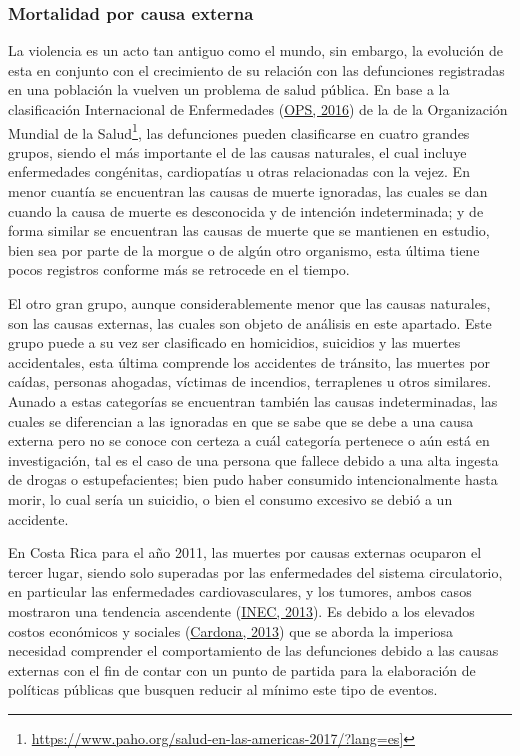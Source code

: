 \documentclass[
]{article}
\begin{document}
\subsubsection{Mortalidad por causa externa}

La violencia es un acto tan antiguo como el mundo, sin embargo, la
evolución de esta en conjunto con el crecimiento de su relación con las
defunciones registradas en una población la vuelven un problema de salud
pública. En base a la clasificación Internacional de Enfermedades
(\protect\hyperlink{ref-CIE10}{OPS, 2016}) de la de la Organización
Mundial de la Salud\footnote{\url{https://www.paho.org/salud-en-las-americas-2017/?lang=es}{]}},
las defunciones pueden clasificarse en cuatro grandes grupos, siendo el
más importante el de las causas naturales, el cual incluye enfermedades
congénitas, cardiopatías u otras relacionadas con la vejez. En menor
cuantía se encuentran las causas de muerte ignoradas, las cuales se dan
cuando la causa de muerte es desconocida y de intención indeterminada; y
de forma similar se encuentran las causas de muerte que se mantienen en
estudio, bien sea por parte de la morgue o de algún otro organismo, esta
última tiene pocos registros conforme más se retrocede en el tiempo.

El otro gran grupo, aunque considerablemente menor que las causas
naturales, son las causas externas, las cuales son objeto de análisis en
este apartado. Este grupo puede a su vez ser clasificado en homicidios,
suicidios y las muertes accidentales, esta última comprende los
accidentes de tránsito, las muertes por caídas, personas ahogadas,
víctimas de incendios, terraplenes u otros similares. Aunado a estas
categorías se encuentran también las causas indeterminadas, las cuales
se diferencian a las ignoradas en que se sabe que se debe a una causa
externa pero no se conoce con certeza a cuál categoría pertenece o aún
está en investigación, tal es el caso de una persona que fallece debido
a una alta ingesta de drogas o estupefacientes; bien pudo haber
consumido intencionalmente hasta morir, lo cual sería un suicidio, o
bien el consumo excesivo se debió a un accidente.

En Costa Rica para el año 2011, las muertes por causas externas ocuparon
el tercer lugar, siendo solo superadas por las enfermedades del sistema
circulatorio, en particular las enfermedades cardiovasculares, y los
tumores, ambos casos mostraron una tendencia ascendente
(\protect\hyperlink{ref-nacion}{INEC, 2013}). Es debido a los elevados
costos económicos y sociales
(\protect\hyperlink{ref-ccpexternas}{Cardona, 2013}) que se aborda la
imperiosa necesidad comprender el comportamiento de las defunciones
debido a las causas externas con el fin de contar con un punto de
partida para la elaboración de políticas públicas que busquen reducir al
mínimo este tipo de eventos.
\end{document}
